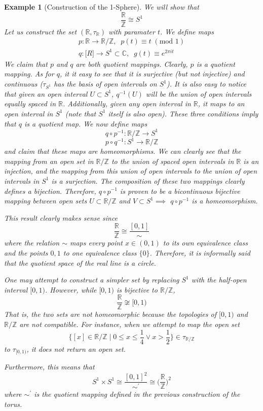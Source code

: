 \documentclass{article}
\newtheorem{example}{Example}[section]
\theoremstyle{remark}
\theoremstyle{definition}
\begin{document}
\begin{example}[Construction of the 1-Sphere]
We will show that
\[\frac{\mathbb{R}}{\mathbb{Z}} \cong S^1\]
Let us construct the set $(\mathbb{R}, \tau_{\mathbb{R}})$ with paramater $t$. We define maps
\begin{align*}
p: \mathbb{R} \longrightarrow \mathbb{R} / \mathbb{Z}, \;\; p(t) \equiv t \; (\text{mod } 1) \\
q: \mathbb[R] \longrightarrow S^1 \subset \mathbb{C}, \;\; g(t) \equiv e^{2 \pi i t} 
\end{align*}
We claim that $p$ and $q$ are both quotient mappings. Clearly, $p$ is a quotient mapping. As for $q$, it it easy to see that it is surjective (but not injective) and continuous ($\tau_{S^1}$ has the basis of open intervals on $S^1$). It is also easy to notice that given an open interval $U \subset S^1$, $q^{-1}(U)$ will be the union of open intervals equally spaced in $\mathbb{R}$. Additionally, given any open interval in $\mathbb{R}$, it maps to an open interval in $S^1$ (note that $S^1$ itself is also open). These three conditions imply that $q$ is a quotient map. We now define maps 
\[ q \circ p^{-1}: \mathbb{R} / \mathbb{Z} \longrightarrow S^1 \]
\[ p \circ q^{-1}: S^1 \longrightarrow \mathbb{R} / \mathbb{Z} \]
and claim that these maps are homeomorphisms. We can clearly see that the mapping from an open set in $\mathbb{R} / \mathbb{Z}$ to the union of spaced open intervals in $\mathbb{R}$ is an injection, and the mapping from this union of open intervals to the union of open intervals in $S^1$ is a surjection. The composition of these two mappings clearly defines a bijection. Therefore, $q \circ p^{-1}$ is proven to be a bicontinuous bijective mapping between open sets $U \subset \mathbb{R} / \mathbb{Z}$ and $V \subset S^1 \implies$ $q \circ p^{-1}$ is a homeomorphism. 

This result clearly makes sense since 
\[\frac{\mathbb{R}}{\mathbb{Z}} \cong \frac{[0,1]}{\sim}\]
where the relation $\sim$ maps every point $x \in (0,1)$ to its own equivalence class and the points $0, 1$ to one equivalence class $\{0\}$. Therefore, it is informally said that the quotient space of the real line is a circle. 

One may attempt to construct a simpler set by replacing $S^1$ with the half-open interval $[0,1)$. However, while $[0,1)$ is bijective to $\mathbb{R} / \mathbb{Z}$,
\[\frac{\mathbb{R}}{\mathbb{Z}} \not\cong [0,1)\]
That is, the two sets are not homeomorphic because the topologies of $[0,1)$ and $\mathbb{R} / \mathbb{Z}$ are not compatible. For instance, when we attempt to map the open set 
\[ \bigg\{ [x] \in \mathbb{R} / \mathbb{Z} \; | \; 0 \leq x \leq \frac{1}{4} \vee x > \frac{1}{2} \bigg\} \in \tau_{\mathbb{R} / \mathbb{Z}} \]
to $\tau_{[0,1)}$, it does not return an open set. 


Furthermore, this means that
\[S^1 \times S^1 \cong \frac{[0,1]^2}{\sim^\prime} \cong \bigg( \frac{\mathbb{R}}{\mathbb{Z}} \bigg)^2\]
where $\sim^\prime$ is the quotient mapping defined in the previous construction of the torus. 
\end{example}
\end{document}
